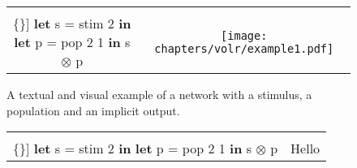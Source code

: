 \begin{figure}
  \ContinuedFloat*
  \begin{tabular}[t]{c c}
    \begin{minipage}{0.5\textwidth}
      \begin{Verbatim}[mathescape,commandchars=\\\{\}]
\textbf{let} s = stim 2 \textbf{in}
  \textbf{let} p = pop 2 1 \textbf{in}
    s $\otimes$ p
      \end{Verbatim}
    \end{minipage} & \begin{minipage}{0.5\textwidth}
      \texttt{[image: chapters/volr/example1.pdf]}
    \end{minipage}

  \end{tabular}
  \caption{A textual and visual example of a network with a stimulus,
    a population and an implicit output.}
  \label{fig:volr-example1}
\end{figure}

\begin{figure}
  \ContinuedFloat*
  \begin{tabular}[t]{c c}
    \begin{minipage}{0.5\textwidth}
      \begin{Verbatim}[mathescape,commandchars=\\\{\}]
\textbf{let} s = stim 2 \textbf{in}
  \textbf{let} p = pop 2 1 \textbf{in}
    s $\otimes$ p
      \end{Verbatim}
    \end{minipage} & \begin{minipage}{0.5\textwidth}
      Hello
    \end{minipage}
  \end{tabular}
\label{fig:volr-examples}
\end{figure}